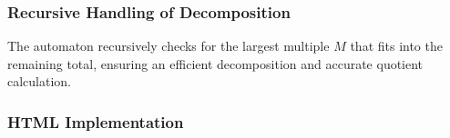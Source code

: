\documentclass[11pt]{article}
\begin{document}
\subsubsection*{Recursive Handling of Decomposition}
The automaton recursively checks for the largest multiple \(M\) that fits into the remaining total, ensuring an efficient decomposition and accurate quotient calculation.


\subsubsection*{HTML Implementation}


\printbibliography
\end{document}
